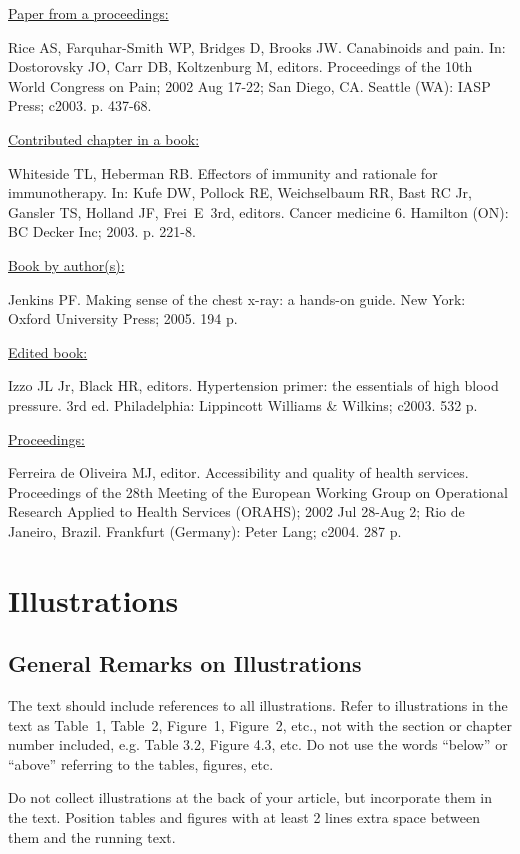 \documentclass{IOS-Book-Article}
\begin{document}
\medskip
\noindent\ul{Paper from a proceedings:}\par\noindent
Rice AS, Farquhar-Smith WP, Bridges D, Brooks JW. Canabinoids and pain. In: Dostorovsky
JO, Carr DB, Koltzenburg M, editors. Proceedings of the 10th World Congress on Pain;
2002 Aug 17-22; San Diego, CA. Seattle (WA): IASP Press; c2003. p. 437-68.

\medskip
\noindent\ul{Contributed chapter in a book:}\par\noindent
Whiteside TL, Heberman RB. Effectors of immunity and rationale for immunotherapy. In:
Kufe DW, Pollock RE, Weichselbaum RR, Bast RC Jr, Gansler TS, Holland JF, Frei~E~3rd,
editors. Cancer medicine 6. Hamilton (ON): BC Decker Inc; 2003. p. 221-8.

\medskip
\noindent\ul{Book by author(s):}\par\noindent
Jenkins PF. Making sense of the chest x-ray: a hands-on guide. New York: Oxford
University Press; 2005. 194 p.

\medskip
\noindent\ul{Edited book:}\par\noindent
Izzo JL Jr, Black HR, editors. Hypertension primer: the essentials of high blood pressure.
3rd ed. Philadelphia: Lippincott Williams \& Wilkins; c2003. 532 p.

\medskip
\noindent\ul{Proceedings:}\par\noindent
Ferreira de Oliveira MJ, editor. Accessibility and quality of health services. Proceedings of
the 28th Meeting of the European Working Group on Operational Research Applied to Health
Services (ORAHS); 2002 Jul 28-Aug 2; Rio de Janeiro, Brazil. Frankfurt (Germany): Peter Lang;
c2004. 287 p.

\section{Illustrations}

\subsection{General Remarks on Illustrations}
The text should include references to all illustrations. Refer to illustrations in the
text as Table~1, Table~2, Figure~1, Figure~2, etc., not with the section or chapter number
included, e.g. Table 3.2, Figure 4.3, etc. Do not use the words ``below'' or ``above''
referring to the tables, figures, etc.

Do not collect illustrations at the back of your article, but incorporate them in the
text. Position tables and figures with at least 2 lines
extra space between them and the running text.
\end{document}
